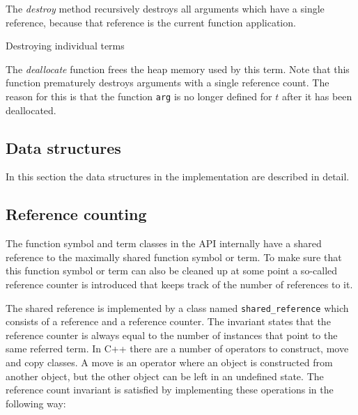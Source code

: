 \documentclass[10pt,a4paper]{article}
\newcommand{\terms}{\mathcal{T}}
\begin{document}
\noindent The \emph{destroy} method recursively destroys all arguments which have a single reference, because that reference is the current function application.

\begin{algorithm}[H]
\caption{Destroying individual terms}\label{alg:destroy}
\begin{algorithmic}[1]
\Procedure{Destroy}{$t : \terms'$}
    \EndIf
  \EndFor
  
  \State {$\terms' \gets \terms' \setminus \{t\}$}
\EndProcedure
\end{algorithmic}
\end{algorithm}

\noindent The \emph{deallocate} function frees the heap memory used by this term.
Note that this function prematurely destroys arguments with a single reference count. 
The reason for this is that the function \texttt{arg} is no longer defined for $t$ after it has been deallocated. 

\subsection{Data structures}

In this section the data structures in the implementation are described in detail.

\subsection{Reference counting}

The function symbol and term classes in the API internally have a shared reference to the maximally shared function symbol or term.
To make sure that this function symbol or term can also be cleaned up at some point a so-called reference counter is introduced that keeps track of the number of references to it.

The shared reference is implemented by a class named \texttt{shared\_reference} which consists of a reference and a reference counter. 
The invariant states that the reference counter is always equal to the number of instances that point to the same referred term. 
In C++ there are a number of operators to construct, move and copy classes.
A move is an operator where an object is constructed from another object, but the other object can be left in an undefined state.
The reference count invariant is satisfied by implementing these operations in the following way:
\end{document}
